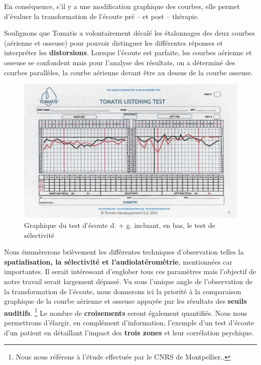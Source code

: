  En  conséquence,  s'il y a une modification
          graphique des courbes, elle
          permet d'évaluer la transformation de l'écoute pré -- et
          post -- thérapie.




Soulignons que Tomatis a volontairement décalé les étalonnages des deux courbes (aérienne
	et osseuse) pour pouvoir distinguer les différentes réponses et interpréter
	les \textbf{distorsions}. Lorsque l'écoute est parfaite, les
	courbes aérienne et osseuse se confondent mais pour l'analyse des
	résultats, on a déterminé des courbes parallèles, la courbe aérienne
	devant être au dessus de la courbe osseuse.


\begin{figure}
	\centering
	\includegraphics[width=0.7\linewidth]{images/tomatisListeningTest.jpg}
	\caption[Graphique du test d'écoute]{Graphique du test
          d'écoute d. + g. incluant, en bas, le test de sélectivité}
	\label{fig:tomatislisteningtest}
\end{figure}



Nous énumèrerons brièvement les
différentes techniques d'observation telles la
\textbf{spatialisation, la
sélectivité et l'audiolatérométrie}, mentionnées car importantes.
 Il serait intéressant d'englober tous ces paramètres mais
  l'objectif de notre travail serait largement dépassé.
Vu sous l'unique angle de l'observation de la transformation de l'écoute, nous
donnerons ici la priorité à la comparaison graphique
de la courbe aérienne et osseuse appuyée par les résultats
des \textbf{seuils auditifs}.
\footnote{Nous nous référons à
  l'étude effectuée par le CNRS de Montpellier,\autocite{affectiveDisorders}.}
Le nombre de \textbf{croisements }seront
également quantifiés.
Nous nous permettrons d'élargir, en
complément d'information, l'exemple d'un test d'écoute d'un patient en détaillant l'impact
des\textbf{ trois zones} et leur corrélation psychique.



